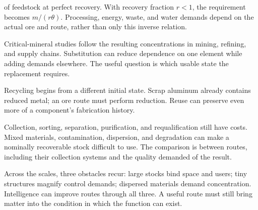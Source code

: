 of feedstock at perfect recovery. With recovery fraction $r<1$, the requirement becomes $m/(r\theta)$. Processing, energy, waste, and water demands depend on the actual ore and route, rather than only this inverse relation.

Critical-mineral studies follow the resulting concentrations in mining, refining, and supply chains.\cite{iea2021criticalminerals} Substitution can reduce dependence on one element while adding demands elsewhere. The useful question is which usable state the replacement requires.


Recycling begins from a different initial state. Scrap aluminum already contains reduced metal; an ore route must perform reduction. Reuse can preserve even more of a component's fabrication history.

Collection, sorting, separation, purification, and requalification still have costs. Mixed materials, contamination, dispersion, and degradation can make a nominally recoverable stock difficult to use. The comparison is between routes, including their collection systems and the quality demanded of the result.

Across the scales, three obstacles recur: large stocks bind space and users; tiny structures magnify control demands; dispersed materials demand concentration. Intelligence can improve routes through all three. A useful route must still bring matter into the condition in which the function can exist.
